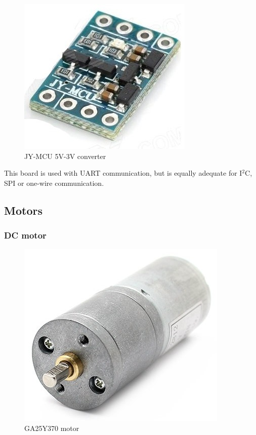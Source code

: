 			\begin{figure}[H]
					\centering
					\includegraphics[scale=0.4]{images/ProjectComponents/logic-voltage.jpg}
					\caption{JY-MCU 5V-3V converter }
					\label{}
			\end{figure}
			\bigskip

		This board is used with UART communication, but is equally adequate for I$^2$C, SPI or one-wire communication.
 











\subsection{Motors}

	\subsubsection{DC motor}
	
		\begin{figure}[H]
			\centering
			\includegraphics[scale=0.4]{images/ProjectComponents/motor.jpg}
			\caption{GA25Y370 motor }
			\label{}
	\end{figure}
	\bigskip

